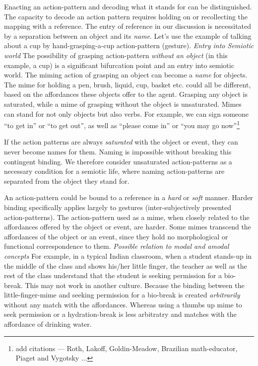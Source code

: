 Enacting an action-pattern and decoding what it stands for can be distinguished. 
The capacity to decode an action pattern requires holding on or recollecting the mapping with a reference. 
The entry of reference in our discussion is necessitated by a separation between an object and its \textit{name}.
Let's use the example of talking about a cup by hand-grasping-a-cup action-pattern (gesture). 
\emph{Entry into Semiotic world} The possibility of grasping action-pattern \textit{without an object} (in this example, a cup) is a significant bifurcation point and an entry into semiotic world. 
The miming action of grasping an object can become a \textit{name} for objects.
The mime for holding a pen, brush, liquid, cup, basket etc. could all be different, based on the affordances these objects offer to the agent. Grasping any object is saturated, while a mime of grasping without the object is unsaturated. 
Mimes can stand for not only objects but also verbs. For example, we can sign someone ``to get in'' or ``to get out'', as well as ``please come in'' or ``you may go now''\footnote{ add citations --- Roth, Lakoff, Goldin-Meadow, Brazilian math-educator, Piaget and Vygotsky ... }

If the action patterns are always \textit{saturated} with the object or event, they can never become names for them. Naming is impossible without breaking this contingent binding. We therefore consider unsaturated action-patterns as a necessary condition for a semiotic life, where naming action-patterns are separated from the object they stand for.

An action-pattern could be bound to a reference in a \textit{hard} or \textit{soft} manner. Harder binding specifically applies largely to gestures (inter-subjectively presented action-patterns). 
The action-pattern used as a mime, when closely related to the affordances offered by the object or event, are harder. 
Some mimes transcend the affordances of the object or an event, since they hold no morphological or functional correspondence to them. \emph{Possible relation to modal and amodal concepts} For example, in a typical Indian classroom, when a student stands-up in the middle of the class and shows his/her little finger, the teacher as well as the rest of the class understand that the student is seeking permission for a bio-break. This may not work in another culture. Because the binding between the little-finger-mime and seeking permission for a bio-break is created \textit{arbitrarily} without any match with the affordances. Whereas using a thumbs up mime to seek permission or a hydration-break is less arbitratry and matches with the affordance of drinking water.

